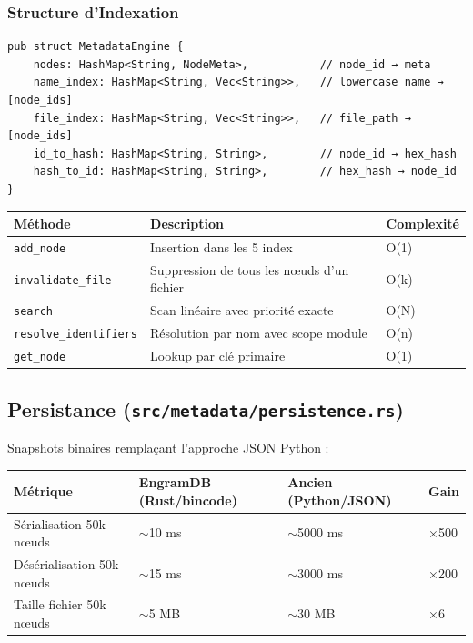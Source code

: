 \documentclass[12pt,a4paper]{article}
\newcommand{\code}[1]{\texttt{#1}}
\begin{document}
\subsubsection{Structure d'Indexation}

\begin{verbatim}
pub struct MetadataEngine {
    nodes: HashMap<String, NodeMeta>,           // node_id → meta
    name_index: HashMap<String, Vec<String>>,   // lowercase name → [node_ids]
    file_index: HashMap<String, Vec<String>>,   // file_path → [node_ids]
    id_to_hash: HashMap<String, String>,        // node_id → hex_hash
    hash_to_id: HashMap<String, String>,        // hex_hash → node_id
}
\end{verbatim}

\begin{center}
\begin{tabularx}{\textwidth}{lXl}
\toprule
\textbf{Méthode} & \textbf{Description} & \textbf{Complexité} \\
\midrule
\code{add\_node} & Insertion dans les 5 index & O(1) \\
\code{invalidate\_file} & Suppression de tous les nœuds d'un fichier & O(k) \\
\code{search} & Scan linéaire avec priorité exacte & O(N) \\
\code{resolve\_identifiers} & Résolution par nom avec scope module & O(n) \\
\code{get\_node} & Lookup par clé primaire & O(1) \\
\bottomrule
\end{tabularx}
\end{center}

\subsection{Persistance (\code{src/metadata/persistence.rs})}

Snapshots binaires remplaçant l'approche JSON Python :

\begin{center}
\begin{tabularx}{\textwidth}{lXXX}
\toprule
\textbf{Métrique} & \textbf{EngramDB (Rust/bincode)} & \textbf{Ancien (Python/JSON)} & \textbf{Gain} \\
\midrule
Sérialisation 50k nœuds & $\sim$10 ms & $\sim$5000 ms & ×500 \\
Désérialisation 50k nœuds & $\sim$15 ms & $\sim$3000 ms & ×200 \\
Taille fichier 50k nœuds & $\sim$5 MB & $\sim$30 MB & ×6 \\
\bottomrule
\end{tabularx}
\end{center}
\end{document}
